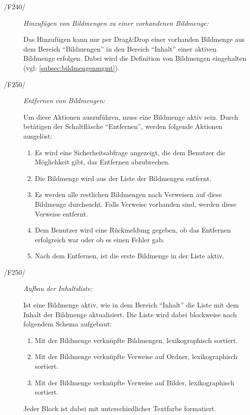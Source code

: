 \begin{description}
\begin{itemize}
			\end{itemize}
		
		\item[/F240/] \textit{Hinzufügen von Bildmengen zu einer vorhandenen Bildmenge:}\par Das Hinzufügen kann nur per Drag\&Drop einer vorhanden Bildmenge aus dem Bereich "`Bildmengen"' in den Bereich "`Inhalt"' einer aktiven Bildmenge erfolgen. Dabei wird die Definition von Bildmengen eingehalten (vgl: \ref{subsec:bildmengenmgmt}).
		
		\item[/F250/] \textit{Entfernen von Bildmengen:}\par Um diese Aktionen auszuführen, muss eine Bildmenge aktiv sein. Durch betätigen der Schaltfläsche "`Entfernen"', werden folgende Aktionen ausgelöst:
			
			\begin{enumerate}
			
				\item Es wird eine Sicherheitsabfrage angezeigt, die dem Benutzer die Möglichkeit gibt, das Entfernen abzubrechen.
				
				\item Die Bildmenge wird aus der Liste der Bildmengen entfernt.
				
				\item Es werden alle restlichen Bildmengen nach Verweisen auf diese Bildmenge durchsucht. Falls Verweise vorhanden sind, werden diese Verweise entfernt.
				
				\item Dem Benutzer wird eine Rückmeldung gegeben, ob das Entfernen erfolgreich war oder ob es einen Fehler gab.
				
				\item Nach dem Entfernen, ist die erste Bildmenge in der Liste aktiv.
			
			\end{enumerate}

		\item[/F250/] \textit{Aufbau der Inhaltsliste:}\par Ist eine Bildmenge aktiv, wie in dem Bereich "`Inhalt"' die Liste mit dem Inhalt der Bildmenge aktualisiert. Die Liste wird dabei blockweise nach folgendem Schema aufgebaut:
		
			\begin{enumerate}
			
				\item Mit der Bildmenge verknüpfte Bildmengen, lexikographisch sortiert.
			
				\item Mit der Bildmenge verknüpfte Verweise auf Ordner, lexikographisch sortiert.
				
				\item Mit der Bildmenge verknüpfte Verweise auf Bilder, lexikographisch sortiert.
				
			\end{enumerate}
			
			Jeder Block ist dabei mit unterschiedlicher Textfarbe formatiert.
		
	\end{description}

